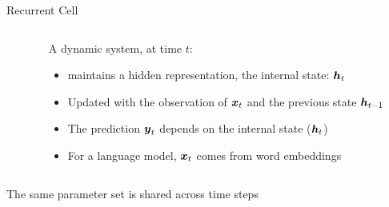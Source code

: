 
\newcommand{\largeur}{0.5}
\newcommand{\hauteur}{1.5}
\newcommand{\rayon}{0.075cm}
\newcommand{\ytext}{-1}
\newcommand{\ytexth}{3*\hauteur+2.5}
\newcommand{\dlayer}[3]{ \draw[fill=#3] (#1,#2) rectangle (#1+\largeur,#2+\hauteur); %
  \foreach \y in {0.25,0.5,...,1.25}{ \draw[fill=black] (#1+\largeur/2,#2+\y) circle (\rayon);};%
}
\newcommand{\greenhc}{\color{green!50!black}}
\newcommand{\hiddenl}{\greenhc\seq{h}_t}

\begin{frame}{Recurrent Cell}
  \begin{columns}
    \begin{column}{0.5\textwidth}
    \end{column}
    \begin{column}{0.5\textwidth}
      A dynamic system, at time $t$:
      \begin{itemize}
      \item maintains a hidden representation, the internal state:  $\boldsymbol{h}_t$
      \item Updated with the observation of $\boldsymbol{x}_t$  and the previous state $\boldsymbol{h}_{t-1}$
      \item The prediction $\boldsymbol{y}_t$ depends on the internal state ($\boldsymbol{h}_t$)
      \item For a language model, $\boldsymbol{x}_t$ comes from word embeddings
      \end{itemize}
    \end{column}
  \end{columns}
  \begin{center}\vfill
    The same parameter set is shared across time steps
  \end{center}
\end{frame}


